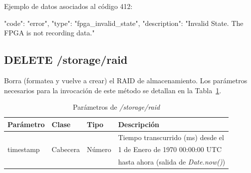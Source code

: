 \begin{itemize}
{\begin{minipage}{\textwidth}
Ejemplo de datos asociados al código 412:

\begin{code}[language=json]
{
  "code": "error",
  "type": "fpga_invalid_state",
  "description": "Invalid State. The FPGA is not recording data."
}
\end{code}
\end{minipage}
}

\end{itemize}

%
%
\subsection{DELETE /storage/raid}
Borra (formatea y vuelve a crear) el \gls{RAID} de almacenamiento.
Los parámetros necesarios para la invocación de este método se detallan en la Tabla~\ref{extra:api:storageraid:invocacion}.

\begin{table}[H]
\centering
\begin{tabular}{|l|l|l|l|}
\hline
\rowcolor[HTML]{F5F5F5}
\textbf{Parámetro}  & \textbf{Clase} & \textbf{Tipo}   & \textbf{Descripción}                         \\ \hline
                    &                &                 & Tiempo transcurrido (ms) desde el            \\
timestamp           & Cabecera       & Número          & 1 de Enero de 1970 00:00:00 UTC              \\
                    &                &                 & hasta ahora (salida de \textit{Date.now()})  \\ \hline
\end{tabular}
\caption{Parámetros de \textit{/storage/raid}}
\label{extra:api:storageraid:invocacion}
\end{table}

